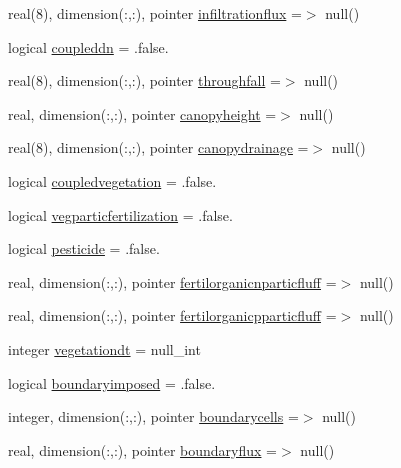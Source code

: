 \begin{DoxyCompactItemize}
\item 
real(8), dimension(\+:,\+:), pointer \mbox{\hyperlink{structmodulerunoffproperties_1_1t__extvar_a905250c48cfe1b273a793e9827d932da}{infiltrationflux}} =$>$ null()
\item 
logical \mbox{\hyperlink{structmodulerunoffproperties_1_1t__extvar_abecd2df845da5c0a693bc9db09e55177}{coupleddn}} = .false.
\item 
real(8), dimension(\+:,\+:), pointer \mbox{\hyperlink{structmodulerunoffproperties_1_1t__extvar_a41723e7cebf15992aa0dc338e31bf06a}{throughfall}} =$>$ null()
\item 
real, dimension(\+:,\+:), pointer \mbox{\hyperlink{structmodulerunoffproperties_1_1t__extvar_af9463282ba7cd387e76153ded24a71d8}{canopyheight}} =$>$ null()
\item 
real(8), dimension(\+:,\+:), pointer \mbox{\hyperlink{structmodulerunoffproperties_1_1t__extvar_af76ee993641d4dd3cbe1b53d88981909}{canopydrainage}} =$>$ null()
\item 
logical \mbox{\hyperlink{structmodulerunoffproperties_1_1t__extvar_aa38058a8c1f04d5d0691b9eaaef7d5b5}{coupledvegetation}} = .false.
\item 
logical \mbox{\hyperlink{structmodulerunoffproperties_1_1t__extvar_ae095de711c88527db4f3f0e87ecc4a7c}{vegparticfertilization}} = .false.
\item 
logical \mbox{\hyperlink{structmodulerunoffproperties_1_1t__extvar_ab09e9566d334ce069acd1693cbf11b48}{pesticide}} = .false.
\item 
real, dimension(\+:,\+:), pointer \mbox{\hyperlink{structmodulerunoffproperties_1_1t__extvar_a228e54661a16a965b3f60e5a52e261a7}{fertilorganicnparticfluff}} =$>$ null()
\item 
real, dimension(\+:,\+:), pointer \mbox{\hyperlink{structmodulerunoffproperties_1_1t__extvar_a8e6fd2961e3188fce07b897eeb7ed3a9}{fertilorganicpparticfluff}} =$>$ null()
\item 
integer \mbox{\hyperlink{structmodulerunoffproperties_1_1t__extvar_a468e3612169988af4c1358cd4a2db26d}{vegetationdt}} = null\+\_\+int
\item 
logical \mbox{\hyperlink{structmodulerunoffproperties_1_1t__extvar_afd300af64322683bac2fce8ab91cb330}{boundaryimposed}} = .false.
\item 
integer, dimension(\+:,\+:), pointer \mbox{\hyperlink{structmodulerunoffproperties_1_1t__extvar_a76f57c3ffec0e0c694ff060e8c3e279b}{boundarycells}} =$>$ null()
\item 
real, dimension(\+:,\+:), pointer \mbox{\hyperlink{structmodulerunoffproperties_1_1t__extvar_a33eb63775ed6818599e1b725864e27c4}{boundaryflux}} =$>$ null()

\end{DoxyCompactItemize}
